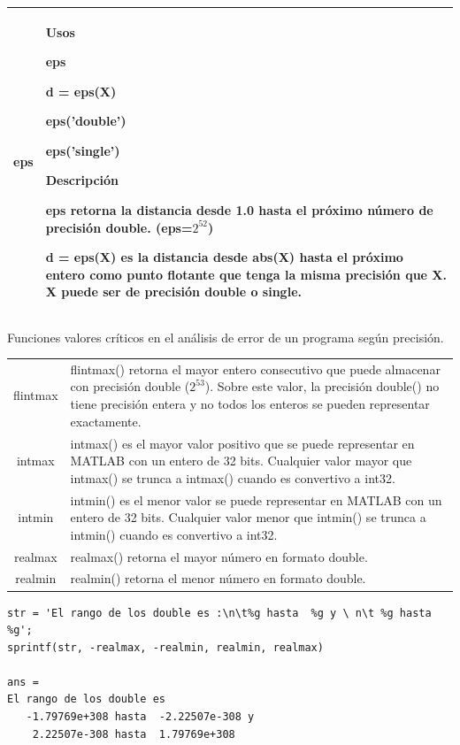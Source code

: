 \documentclass[11pt]{article}
\begin{document}
\begin{longtable}{|c||p{}|}
\hline
eps		& 
Usos


eps

d = eps(X)

eps('double')

eps('single')

Descripci\'on

eps retorna la distancia desde 1.0 hasta el pr\'oximo n\'umero de precisi\'on double. (eps=$2^{52}$)

d = eps(X) es la distancia desde abs(X) hasta el pr\'oximo entero como punto flotante que tenga la misma precisi\'on que X. X puede ser de precisi\'on double o single.
\\
\hline
\end{longtable}

Funciones valores cr\'iticos en el an\'alisis de error de un programa seg\'un precisi\'on.

\begin{longtable}{|c||p{}|}
\hline
flintmax		& 	flintmax() retorna el mayor entero consecutivo que puede almacenar con precisi\'on double ($2^{53}$). Sobre este valor, la precisi\'on double() no tiene precisi\'on entera y no todos los enteros se pueden representar exactamente. \\
intmax			& 	intmax() es el mayor valor positivo que se puede representar en MATLAB con un entero de 32 bits. Cualquier valor mayor que intmax() se trunca a intmax() cuando es convertivo a int32. \\
intmin			& 	intmin() es el menor valor se puede representar en MATLAB con un entero de 32 bits. Cualquier valor menor que intmin() se trunca a intmin() cuando es convertivo a int32. \\
realmax			& 	realmax() retorna el mayor n\'umero en formato double. \\
realmin			& 	realmin() retorna el menor n\'umero en formato double. \\
\hline
\end{longtable}

\begin{verbatim}
str = 'El rango de los double es :\n\t%g hasta  %g y \ n\t %g hasta  %g';
sprintf(str, -realmax, -realmin, realmin, realmax)

ans =
El rango de los double es
   -1.79769e+308 hasta  -2.22507e-308 y
    2.22507e-308 hasta  1.79769e+308
\end{verbatim}


\end{document}
